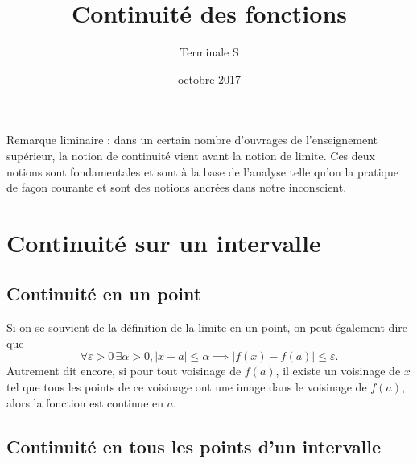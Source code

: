 \documentclass[12pt,a4paper]{article}
\title{Continuité des fonctions}
\author{Terminale S}
\date{octobre 2017}
\makeatletter
\renewcommand{\maketitle}%
{\framebox{%
    \begin{minipage}{1.0\linewidth}%
      \begin{center}%
        \Large \@title ~-- \@author \\%
        \@date%
      \end{center}%
    \end{minipage}}%
  \normalsize%
}
\newcommand{\abs}[1]{\left\lvert #1 \right\rvert}
\theoremstyle{break}
\newtheorem{definition}{Définition}
\theoremstyle{plain}
\theoremstyle{nonumberplain}
\theoremstyle{nonumberbreak}
\makeatother
\begin{document}
\maketitle

Remarque liminaire : dans un certain nombre d'ouvrages de l'enseignement
supérieur, la notion de continuité vient avant la notion de limite. Ces
deux notions sont fondamentales et sont à la base de l'analyse telle
qu'on la pratique de façon courante et sont des notions ancrées dans
notre inconscient.

\section{Continuité sur un intervalle}

\subsection{Continuité en un point}


Si on se souvient de la définition de la limite en un point, on peut
également dire que \[ \forall \varepsilon > 0\, \exists \alpha > 0,
\abs{x - a} \leq \alpha \implies \abs{f(x) - f(a)} \leq \varepsilon .\]
Autrement dit encore, si pour tout voisinage de $f(a)$, il existe un
voisinage de $x$ tel que tous les points de ce voisinage ont une image
dans le voisinage de $f(a)$, alors la fonction est continue en $a$.

\subsection{Continuité en tous les points d'un intervalle}

\end{document}
